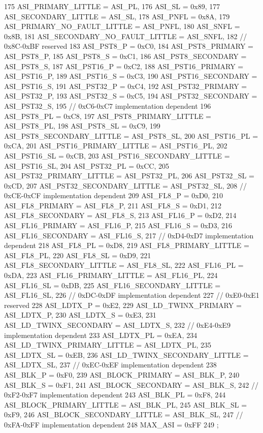 \begin{DoxyCode}
{175     ASI_PRIMARY_LITTLE = ASI_PL,
176     ASI_SL = 0x89,
177     ASI_SECONDARY_LITTLE = ASI_SL,
178     ASI_PNFL = 0x8A,
179     ASI_PRIMARY_NO_FAULT_LITTLE = ASI_PNFL,
180     ASI_SNFL = 0x8B,
181     ASI_SECONDARY_NO_FAULT_LITTLE = ASI_SNFL,
182     // 0x8C-0xBF reserved
183     ASI_PST8_P = 0xC0,
184     ASI_PST8_PRIMARY = ASI_PST8_P,
185     ASI_PST8_S = 0xC1,
186     ASI_PST8_SECONDARY = ASI_PST8_S,
187     ASI_PST16_P = 0xC2,
188     ASI_PST16_PRIMARY = ASI_PST16_P,
189     ASI_PST16_S = 0xC3,
190     ASI_PST16_SECONDARY = ASI_PST16_S,
191     ASI_PST32_P = 0xC4,
192     ASI_PST32_PRIMARY = ASI_PST32_P,
193     ASI_PST32_S = 0xC5,
194     ASI_PST32_SECONDARY = ASI_PST32_S,
195     // 0xC6-0xC7 implementation dependent
196     ASI_PST8_PL = 0xC8,
197     ASI_PST8_PRIMARY_LITTLE = ASI_PST8_PL,
198     ASI_PST8_SL = 0xC9,
199     ASI_PST8_SECONDARY_LITTLE = ASI_PST8_SL,
200     ASI_PST16_PL = 0xCA,
201     ASI_PST16_PRIMARY_LITTLE = ASI_PST16_PL,
202     ASI_PST16_SL = 0xCB,
203     ASI_PST16_SECONDARY_LITTLE = ASI_PST16_SL,
204     ASI_PST32_PL = 0xCC,
205     ASI_PST32_PRIMARY_LITTLE = ASI_PST32_PL,
206     ASI_PST32_SL = 0xCD,
207     ASI_PST32_SECONDARY_LITTLE = ASI_PST32_SL,
208     // 0xCE-0xCF implementation dependent
209     ASI_FL8_P = 0xD0,
210     ASI_FL8_PRIMARY = ASI_FL8_P,
211     ASI_FL8_S = 0xD1,
212     ASI_FL8_SECONDARY = ASI_FL8_S,
213     ASI_FL16_P = 0xD2,
214     ASI_FL16_PRIMARY = ASI_FL16_P,
215     ASI_FL16_S = 0xD3,
216     ASI_FL16_SECONDARY = ASI_FL16_S,
217     // 0xD4-0xD7 implementation dependent
218     ASI_FL8_PL = 0xD8,
219     ASI_FL8_PRIMARY_LITTLE = ASI_FL8_PL,
220     ASI_FL8_SL = 0xD9,
221     ASI_FL8_SECONDARY_LITTLE = ASI_FL8_SL,
222     ASI_FL16_PL = 0xDA,
223     ASI_FL16_PRIMARY_LITTLE = ASI_FL16_PL,
224     ASI_FL16_SL = 0xDB,
225     ASI_FL16_SECONDARY_LITTLE = ASI_FL16_SL,
226     // 0xDC-0xDF implementation dependent
227     // 0xE0-0xE1 reserved
228     ASI_LDTX_P = 0xE2,
229     ASI_LD_TWINX_PRIMARY = ASI_LDTX_P,
230     ASI_LDTX_S = 0xE3,
231     ASI_LD_TWINX_SECONDARY = ASI_LDTX_S,
232     // 0xE4-0xE9 implementation dependent
233     ASI_LDTX_PL = 0xEA,
234     ASI_LD_TWINX_PRIMARY_LITTLE = ASI_LDTX_PL,
235     ASI_LDTX_SL = 0xEB,
236     ASI_LD_TWINX_SECONDARY_LITTLE = ASI_LDTX_SL,
237     // 0xEC-0xEF implementation dependent
238     ASI_BLK_P = 0xF0,
239     ASI_BLOCK_PRIMARY = ASI_BLK_P,
240     ASI_BLK_S = 0xF1,
241     ASI_BLOCK_SECONDARY = ASI_BLK_S,
242     // 0xF2-0xF7 implementation dependent
243     ASI_BLK_PL = 0xF8,
244     ASI_BLOCK_PRIMARY_LITTLE = ASI_BLK_PL,
245     ASI_BLK_SL = 0xF9,
246     ASI_BLOCK_SECONDARY_LITTLE = ASI_BLK_SL,
247     // 0xFA-0xFF implementation dependent
248     MAX_ASI = 0xFF
249 };
\end{DoxyCode}
